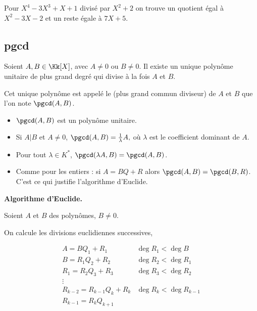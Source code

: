 \documentclass[class=report,crop=false]{standalone}
\begin{document}
\begin{exemple}
Pour $X^4-3X^3+X+1$ divisé par $X^2+2$ on trouve un quotient égal à $X^2-3X-2$ et
un reste égale à $7X+5$.

\end{exemple}




\subsection{pgcd}

\begin{proposition}
\label{prop_pgcd1}
Soient  $A,B \in\Kk[X]$, avec $A \neq 0$ ou $B \neq 0$.
Il existe un unique polynôme unitaire de plus grand degré qui
divise à la fois $A$ et $B$.
\end{proposition}

Cet unique polynôme est appelé le  (plus grand commun diviseur) de $A$ et $B$
que l'on note $\pgcd(A,B)$.

\begin{remarque*}
\sauteligne
\begin{itemize}
  \item $\pgcd(A,B)$ est un polynôme unitaire.
  \item Si $A|B$ et $A \neq 0$, $\pgcd(A,B)=\frac{1}{\lambda}A, $ où $\lambda$
est le coefficient dominant de $A$.
  \item Pour tout $\lambda \in K^*$, $\pgcd( \lambda A,B)= \pgcd(A,B)$.
  \item Comme pour les entiers : si $A=BQ+R$ alors $\pgcd(A,B) = \pgcd(B,R)$.
  C'est ce qui justifie l'algorithme d'Euclide.
\end{itemize}
\end{remarque*}


\textbf{Algorithme d'Euclide.}

Soient $A$ et $B$ des polynômes, $B \neq 0$.

On calcule les divisions euclidiennes successives,

$$\begin{array}{ll}
A = B Q_1+R_1 \quad \quad & \deg R_1 < \deg B \\
B = R_1 Q_2 + R_2  & \deg R_2 < \deg R_1 \\
R_1=R_2Q_3+R_3 & \deg R_3 < \deg R_2 \\
\vdots & \\
R_{k-2}=R_{k-1}Q_{k}+R_k  & \deg R_k < \deg R_{k-1} \\
R_{k-1}=R_kQ_{k+1} & \\
\end{array}$$
\end{document}
